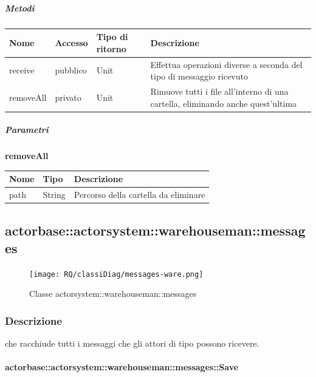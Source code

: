 \documentclass{scalatekids-article}
\begin{document}
\subparagraph{Metodi}
\begin{tabular}{| l | l | l | l |}
  \hline
  Nome & Accesso & Tipo di ritorno & Descrizione\\
  \hline
  receive & pubblico & Unit & Effettua operazioni diverse a seconda del tipo di messaggio ricevuto \\
  \hline
  removeAll & privato & Unit & Rimuove tutti i file all'interno di una cartella, eliminando anche quest'ultima \\
  \hline
\end{tabular}

\subparagraph{Parametri}

\begin{center}
  \textbf{removeAll}\\
\end{center}
\begin{tabular}{| l | l | l |}
  \hline
  Nome & Tipo & Descrizione\\
  \hline
  path & String & Percorso della cartella da eliminare\\
  \hline
\end{tabular}

\subsection{actorbase::actorsystem::warehouseman::messages}
\label{sec:actorbase::actorsystem::warehouseman::messages}

\begin{figure}[H]
  \begin{center}
    \texttt{[image: RQ/classiDiag/messages-ware.png]}
    \caption{Classe actorsystem::warehouseman::messages}
  \end{center}
\end{figure}

\subsubsection{Descrizione}

 che racchiude tutti i messaggi che gli attori di tipo
 possono ricevere.

\paragraph{actorbase::actorsystem::warehouseman::messages::Save}
\label{sec:actorbase::actorsystem::warehouseman::messages::Save}
\end{document}
